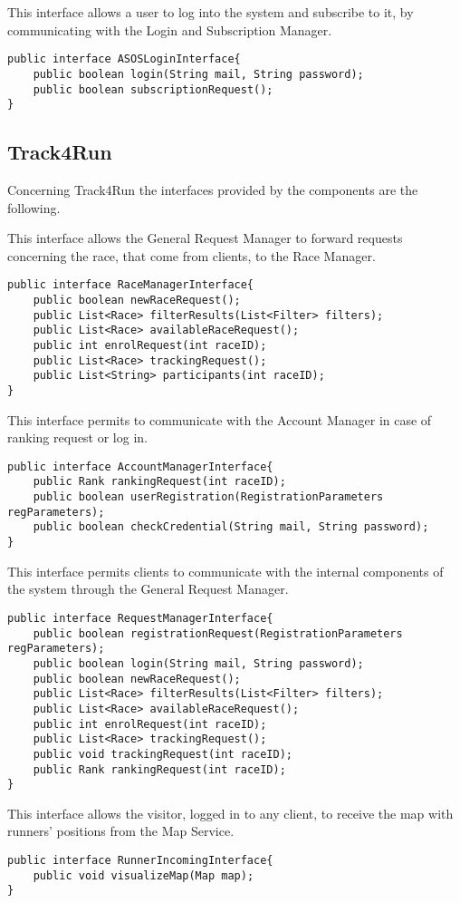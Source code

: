 This interface allows a user to log into the system and subscribe to it, by communicating with the Login and Subscription Manager.
\begin{lstlisting}
public interface ASOSLoginInterface{
	public boolean login(String mail, String password);
	public boolean subscriptionRequest();
}
\end{lstlisting}


\subsection{Track4Run}

Concerning Track4Run the interfaces provided by the components are the following.

This interface allows the General Request Manager to forward requests concerning the race, that come from clients, to the Race Manager.
\begin{lstlisting}
public interface RaceManagerInterface{
	public boolean newRaceRequest();
	public List<Race> filterResults(List<Filter> filters);
	public List<Race> availableRaceRequest();
	public int enrolRequest(int raceID);
	public List<Race> trackingRequest();
	public List<String> participants(int raceID);
}
\end{lstlisting}

This interface permits to communicate with the Account Manager in case of ranking request or log in.
\begin{lstlisting}
public interface AccountManagerInterface{
	public Rank rankingRequest(int raceID);
	public boolean userRegistration(RegistrationParameters regParameters);
	public boolean checkCredential(String mail, String password);
}
\end{lstlisting}

This interface permits clients to communicate with the internal components of the system through the General Request Manager.
\begin{lstlisting}
public interface RequestManagerInterface{
	public boolean registrationRequest(RegistrationParameters regParameters);
	public boolean login(String mail, String password);
	public boolean newRaceRequest();
	public List<Race> filterResults(List<Filter> filters);
	public List<Race> availableRaceRequest();
	public int enrolRequest(int raceID);
	public List<Race> trackingRequest();
	public void trackingRequest(int raceID);
	public Rank rankingRequest(int raceID);
}
\end{lstlisting}

This interface allows the visitor, logged in to any client, to receive the map with runners' positions from the Map Service. 
\begin{lstlisting}
public interface RunnerIncomingInterface{
	public void visualizeMap(Map map);
}
\end{lstlisting}

